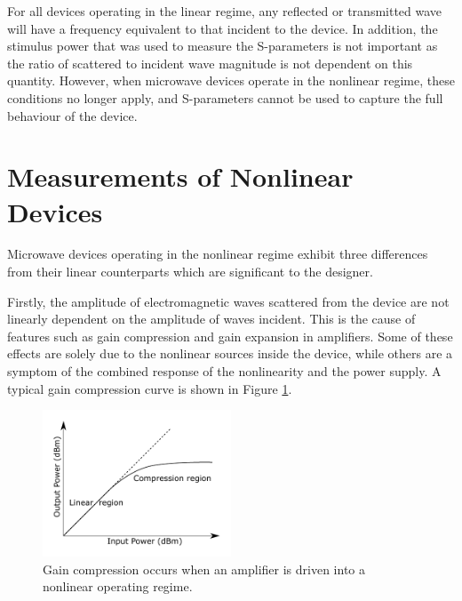 \documentclass[../thesis/thesis.tex]{subfiles}
\begin{document}
For all devices operating in the linear regime, any reflected or transmitted wave will have a frequency equivalent to that incident to the device. In addition, the stimulus power that was used to measure the S-parameters is not important as the ratio of scattered to incident wave magnitude is not dependent on this quantity. However, when microwave devices operate in the nonlinear regime, these conditions no longer apply, and S-parameters cannot be used to capture the full behaviour of the device.

\section{Measurements of Nonlinear Devices}

Microwave devices operating in the nonlinear regime exhibit three differences from their linear counterparts which are significant to the designer.

Firstly, the amplitude of electromagnetic waves scattered from the device are not linearly dependent on the amplitude of waves incident. This is the cause of features such as gain compression and gain expansion in amplifiers. Some of these effects are solely due to the nonlinear sources inside the device, while others are a symptom of the combined response of the nonlinearity and the power supply. A typical gain compression curve is shown in Figure \ref{ch2_fig_comp}.

\begin{figure}
	\centering
	\includegraphics[width=0.5\textwidth]{ch2_compression}
	\caption[An illustration of gain compression.]{Gain compression occurs when an amplifier is driven into a nonlinear operating regime.}
	\label{ch2_fig_comp}
\end{figure}
\end{document}
